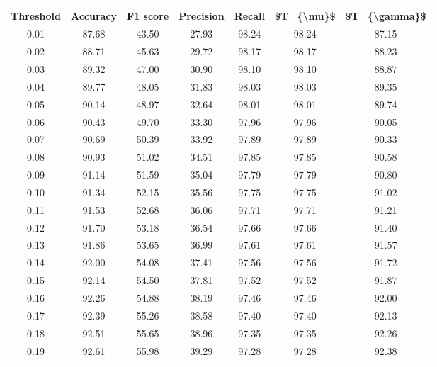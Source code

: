 \begin{tabular}{|c|c|c|c|c|c|c|}
\hline
 Threshold &  Accuracy &  F1 score &  Precision &  Recall &  \$T\_\{\textbackslash mu\}\$ &  \$T\_\{\textbackslash gamma\}\$ \\
\hline
      0.01 &     87.68 &     43.50 &      27.93 &   98.24 &      98.24 &         87.15 \\
      0.02 &     88.71 &     45.63 &      29.72 &   98.17 &      98.17 &         88.23 \\
      0.03 &     89.32 &     47.00 &      30.90 &   98.10 &      98.10 &         88.87 \\
      0.04 &     89.77 &     48.05 &      31.83 &   98.03 &      98.03 &         89.35 \\
      0.05 &     90.14 &     48.97 &      32.64 &   98.01 &      98.01 &         89.74 \\
      0.06 &     90.43 &     49.70 &      33.30 &   97.96 &      97.96 &         90.05 \\
      0.07 &     90.69 &     50.39 &      33.92 &   97.89 &      97.89 &         90.33 \\
      0.08 &     90.93 &     51.02 &      34.51 &   97.85 &      97.85 &         90.58 \\
      0.09 &     91.14 &     51.59 &      35.04 &   97.79 &      97.79 &         90.80 \\
      0.10 &     91.34 &     52.15 &      35.56 &   97.75 &      97.75 &         91.02 \\
      0.11 &     91.53 &     52.68 &      36.06 &   97.71 &      97.71 &         91.21 \\
      0.12 &     91.70 &     53.18 &      36.54 &   97.66 &      97.66 &         91.40 \\
      0.13 &     91.86 &     53.65 &      36.99 &   97.61 &      97.61 &         91.57 \\
      0.14 &     92.00 &     54.08 &      37.41 &   97.56 &      97.56 &         91.72 \\
      0.15 &     92.14 &     54.50 &      37.81 &   97.52 &      97.52 &         91.87 \\
      0.16 &     92.26 &     54.88 &      38.19 &   97.46 &      97.46 &         92.00 \\
      0.17 &     92.39 &     55.26 &      38.58 &   97.40 &      97.40 &         92.13 \\
      0.18 &     92.51 &     55.65 &      38.96 &   97.35 &      97.35 &         92.26 \\
      0.19 &     92.61 &     55.98 &      39.29 &   97.28 &      97.28 &         92.38 \\

\end{tabular}
